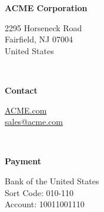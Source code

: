 \documentclass[
	a4paper, %
	10pt, %
]{CSMinimalInvoice}
\begin{document}
\begin{minipage}[t]{0.3\textwidth}
	\itshape %
	
	\textbf{ACME Corporation} %
	
	2295 Horseneck Road \\ %
	Fairfield, NJ 07004 \\
	United States \\
\end{minipage}
\begin{minipage}[t]{0.03\textwidth}
	~ %
\end{minipage}
\begin{minipage}[t]{0.3\textwidth}
	\itshape %
	
	\textbf{Contact}
	
	\href{https://www.latextemplates.com}{ACME.com} \\ %
	\href{mailto:sales@acme.com}{sales@acme.com} \\
\end{minipage}
\begin{minipage}[t]{0.03\textwidth}
	~ %
\end{minipage}
\begin{minipage}[t]{0.3\textwidth}
	\itshape %
	
	\textbf{Payment}
	
	Bank of the United States \\ %
	Sort Code: 010-110 \\
	Account: 10011001110 \\
\end{minipage}

\end{document}

